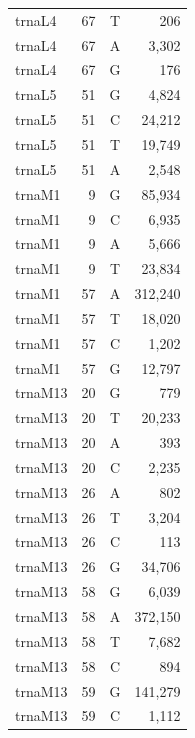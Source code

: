 \documentclass[12pt]{rockefeller}
\begin{document}
{\begin{center}
\begin{supertabular}{|l|r|c|r|}
  trnaL4 &        67 &          T &        206 \\
  trnaL4 &        67 &          A &      3,302 \\
  trnaL4 &        67 &          G &        176 \\
  trnaL5 &        51 &          G &      4,824 \\
  trnaL5 &        51 &          C &     24,212 \\
  trnaL5 &        51 &          T &     19,749 \\
  trnaL5 &        51 &          A &      2,548 \\
  trnaM1 &         9 &          G &     85,934 \\
  trnaM1 &         9 &          C &      6,935 \\
  trnaM1 &         9 &          A &      5,666 \\
  trnaM1 &         9 &          T &     23,834 \\
  trnaM1 &        57 &          A &    312,240 \\
  trnaM1 &        57 &          T &     18,020 \\
  trnaM1 &        57 &          C &      1,202 \\
  trnaM1 &        57 &          G &     12,797 \\
 trnaM13 &        20 &          G &        779 \\
 trnaM13 &        20 &          T &     20,233 \\
 trnaM13 &        20 &          A &        393 \\
 trnaM13 &        20 &          C &      2,235 \\
 trnaM13 &        26 &          A &        802 \\
 trnaM13 &        26 &          T &      3,204 \\
 trnaM13 &        26 &          C &        113 \\
 trnaM13 &        26 &          G &     34,706 \\
 trnaM13 &        58 &          G &      6,039 \\
 trnaM13 &        58 &          A &    372,150 \\
 trnaM13 &        58 &          T &      7,682 \\
 trnaM13 &        58 &          C &        894 \\
 trnaM13 &        59 &          G &    141,279 \\
 trnaM13 &        59 &          C &      1,112 \\

\end{supertabular}
\end{center}}
\end{document}
